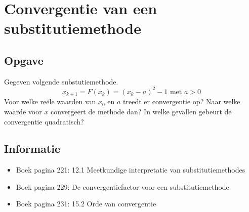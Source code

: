 \documentclass[examenvragen.tex]{subfiles}
\begin{document}
\section{Convergentie van een substitutiemethode}

\subsection{Opgave}
Gegeven volgende substutiemethode.
\[
x_{k+1} = F(x_{k}) = (x_{k}-a)^2-1 \text{ met } a>0
\]
Voor welke re\"ele waarden van $x_0$ en $a$ treedt er convergentie op? Naar welke waarde voor $x$ convergeert de methode dan?
In welke gevallen gebeurt de convergentie quadratisch?

\subsection{Informatie}
\begin{itemize}
\item Boek pagina 221: 12.1 Meetkundige interpretatie van substitutiemethodes
\item Boek pagina 229: De convergentiefactor voor een substitutiemethode
\item Boek pagina 231: 15.2 Orde van convergentie
\end{itemize}
\end{document}
